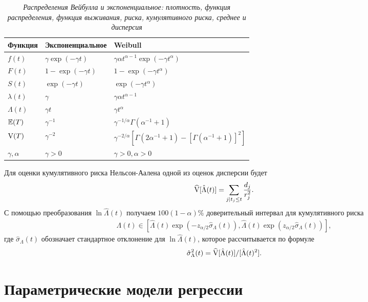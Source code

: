     \begin{table}[!htbp]\caption{\textit{Распределения Вейбулла и экспоненциальное: плотность, функция распределения, функция выживания, риска, кумулятивного риска, среднее и дисперсия}}\label{tab:17.4}
    \begin{center}
\begin{tabular}{lll}
\hline \hline
\textbf{Функция}&\textbf{Экспоненциальное}&\textbf{Weibull}\\
\hline
$f(t)$          &$\gamma\exp{(-\gamma t)}$  &$\gamma \alpha t^{\alpha-1}\exp{(-\gamma t^{\alpha})}$\\
$F(t)$          &$1-\exp{(-\gamma t)}$      &$1-\exp{(-\gamma t^{\alpha})}$\\
$S(t)$          &$\exp{(-\gamma t)}$        &$\exp{(-\gamma t^{\alpha})}$\\
$\lambda(t)$    &$\gamma$                   &$\gamma\alpha t^{\alpha-1}$\\
$\Lambda(t)$    &$\gamma t$                 &$\gamma t^{\alpha}$\\
$\mathbb{E}(T)$ &$\gamma^{-1}$              &$\gamma^{-1/\alpha}\Gamma(\alpha^{-1}+1)$\\
$\mathrm{V}(T)$ &$\gamma^{-2}$              &$\gamma^{-2/\alpha}[\Gamma(2\alpha^{-1}+1)-[\Gamma(\alpha^{-1}+1)]^2]$\\
$\gamma,\alpha$ &$\gamma>0$                 &$\gamma>0,\alpha>0$\\
\hline \hline
\end{tabular}
    \end{center}
    \end{table}

Для оценки кумулятивного риска Нельсон-Аалена одной из оценок дисперсии будет
    $$\widehat{\mathrm{V}}[\hat{\Lambda}(t)]=\sum_{j|t_j\le t} \frac{d_j}{r^2_j}.$$
С помощью преобразования $\ln\hat{\Lambda}(t)$ получаем $100(1-\alpha)\%$ доверительный интервал для кумулятивного риска
        \begin{align}
        \label{eq:17.16}
        \Lambda(t)\in [\hat{\Lambda}(t)\exp{(-z_{\alpha/2}\hat{\sigma}_{\Lambda}(t))}, \hat{\Lambda}(t)\exp{(z_{\alpha/2}\hat{\sigma}_{\Lambda}(t))}],
        \end{align}
где $\hat{\sigma}_{\Lambda}(t)$ обозначает стандартное отклонение для $\ln\hat{\Lambda}(t)$, которое рассчитывается по формуле
$$\hat{\sigma}^2_{\Lambda}(t)=\widehat{\mathrm{V}}[\hat{\Lambda}(t)]/[\hat{\Lambda}(t)^2].$$




\section{Параметрические модели регрессии}\label{sec:17.6}

